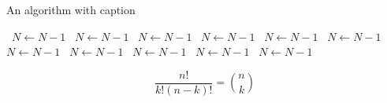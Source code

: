 \documentclass[a4paper]{article}
\begin{document}
\begin{algorithm}
\caption{An algorithm with caption}
\begin{algorithmic}
\    \State $N \gets N - 1$
\    \State $N \gets N - 1$
\    \State $N \gets N - 1$
\    \State $N \gets N - 1$
\    \State $N \gets N - 1$
\    \State $N \gets N - 1$
\    \State $N \gets N - 1$
\    \State $N \gets N - 1$
\    \State $N \gets N - 1$
\    \State $N \gets N - 1$
\    \State $N \gets N - 1$
\EndWhile
\end{algorithmic}
\end{algorithm}

\[ \frac{n!}{k!(n-k)!} = \binom{n}{k} \]
\end{document}
